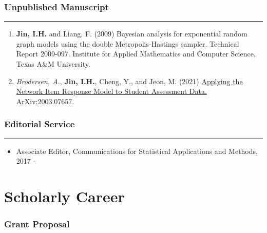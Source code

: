 \documentclass[
]{book}
\providecommand{\tightlist}{%
  \setlength{\itemsep}{0pt}\setlength{\parskip}{0pt}}
\begin{document}
\hypertarget{unpublished-manuscript}{%
\subsubsection*{Unpublished Manuscript}\label{unpublished-manuscript}}

\begin{center}\rule{0.5\linewidth}{0.5pt}\end{center}

\begin{enumerate}
\def\labelenumi{\arabic{enumi}.}
\item
  \textbf{Jin, I.H.} and Liang, F. (2009) Bayesian analysis for exponential random graph models using the double Metropolis-Hastings sampler. Technical Report 2009-097. Institute for Applied Mathematics and Computer Science, Texas A\&M University.
\item
  \emph{Brodersen, A.}, \textbf{Jin, I.H.}, Cheng, Y., and Jeon, M. (2021) \href{https://arxiv.org/abs/2003.07657}{Applying the Network Item Response Model to Student Assessment Data.} ArXiv:2003.07657.
\end{enumerate}

\hypertarget{editorial-service}{%
\subsubsection*{Editorial Service}\label{editorial-service}}

\begin{center}\rule{0.5\linewidth}{0.5pt}\end{center}

\begin{itemize}
\tightlist
\item
  Associate Editor, Communications for Statistical Applications and Methods, 2017 -
\end{itemize}

\hypertarget{scholarly-career}{%
\section*{Scholarly Career}\label{scholarly-career}}

\hypertarget{grant-proposal}{%
\subsubsection*{Grant Proposal}\label{grant-proposal}}
\end{document}
